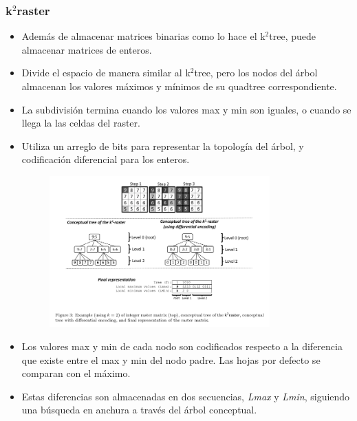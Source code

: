 \documentclass{article}
\begin{document}
\subsubsection*{k$^2$raster}
\begin{itemize}
  \item Además de almacenar matrices binarias como lo hace el k$^2$tree, puede
    almacenar matrices de enteros.
  \item Divide el espacio de manera similar al k$^2$tree, pero los nodos
    del árbol almacenan los valores máximos y mínimos de su quadtree
    correspondiente.
  \item La subdivisión termina cuando los valores max y min son iguales, o cuando
    se llega la las celdas del raster.
  \item Utiliza un arreglo de bits para representar la topología del árbol,
    y codificación diferencial para los enteros.
  \begin{figure}[h]
    \centering
    \includegraphics[width=0.8\textwidth]{../images/k2raster.png}
  \end{figure}
  \item Los valores max y min de cada nodo son codificados respecto a la
    diferencia que existe entre el max y min del nodo padre. Las hojas por
    defecto se comparan con el máximo.
   \item Estas diferencias son almacenadas en dos secuencias,
     \emph{Lmax} y \emph{Lmin}, siguiendo una búsqueda en anchura a través del
     árbol conceptual.
\end{itemize}
\end{document}
